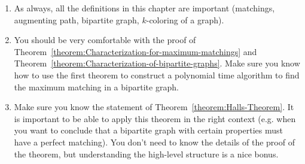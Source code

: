 \begin{gram}
\label{grm:matchings-in-graphs::always}
\begin{enumerate}
    \item As always, all the definitions in this chapter are important (matchings, augmenting path, bipartite graph, $k$-coloring of a graph).
    \item You should be very comfortable with the proof of Theorem~\ref{theorem:Characterization-for-maximum-matchings} and Theorem~\ref{theorem:Characterization-of-bipartite-graphs}. Make sure you know how to use the first theorem to construct a polynomial time algorithm to find the maximum matching in a bipartite graph.
    \item Make sure you know the statement of Theorem~\ref{theorem:Halls-Theorem}. It is important to be able to apply this theorem in the right context (e.g. when you want to conclude that a bipartite graph with certain properties must have a perfect matching). You don't need to know the details of the proof of the theorem, but understanding the high-level structure is a nice bonus.
\end{enumerate}

\end{gram}

